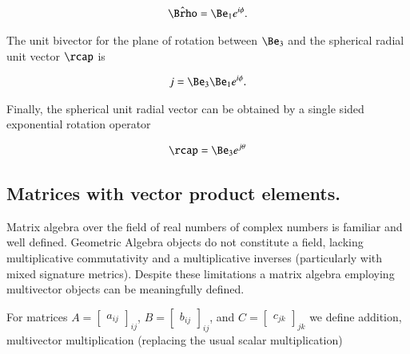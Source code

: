 \begin{align}\label{eqn:gaMintro:mp60}
\hat{\Brho} = \Be_1 e^{i \phi}.
\end{align}

The unit bivector for the plane of rotation between $\Be_3$ and the spherical radial unit vector $\rcap$ is

\begin{align}\label{eqn:gaMintro:mp70}
j = \Be_3 \Be_1 e^{i \phi}.
\end{align}

Finally, the spherical unit radial vector can be obtained by a single sided exponential rotation operator

\begin{align}\label{eqn:gaMintro:mp80}
\rcap = \Be_3 e^{j \theta}
\end{align}



\subsection{Matrices with vector product elements.}

Matrix algebra over the field of real numbers of complex numbers is familiar and well defined.  Geometric Algebra objects do not constitute a field, lacking multiplicative commutativity and a multiplicative inverses (particularly with mixed signature metrics).  Despite these limitations a matrix algebra employing multivector objects can be meaningfully defined.

For matrices $A = {\begin{bmatrix} a_{ij} \end{bmatrix}}_{ij}$, $B = {\begin{bmatrix} b_{ij} \end{bmatrix}}_{ij}$, and $C = {\begin{bmatrix} c_{jk} \end{bmatrix}}_{jk}$ we define addition, multivector multiplication (replacing the usual scalar multiplication)

